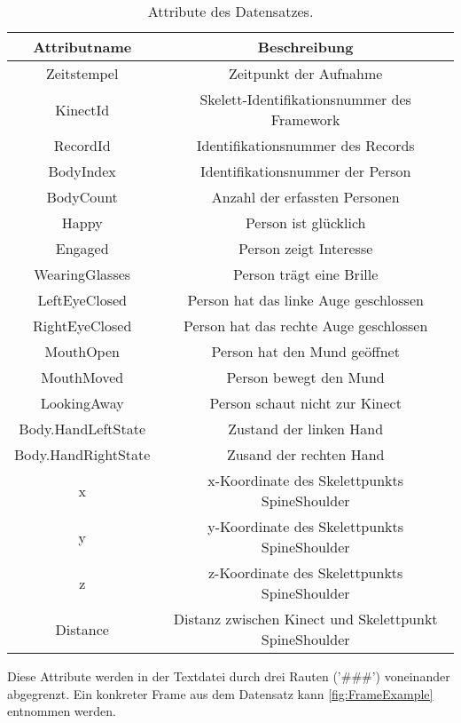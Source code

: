 \begin{table}[ht]
  \begin{center}
    \begin{tabular}{ |c|c| } 
      \hline
      Attributname & Beschreibung \\
      \hline \hline
      Zeitstempel & Zeitpunkt der Aufnahme \\
      \hline
      KinectId & Skelett-Identifikationsnummer des Framework  \\
      \hline
      RecordId & Identifikationsnummer des Records \\
      \hline
      BodyIndex & Identifikationsnummer der Person \\
      \hline
      BodyCount & Anzahl der erfassten Personen \\
      \hline
      Happy & Person ist glücklich \\
      \hline
      Engaged & Person zeigt Interesse \\
      \hline
      WearingGlasses & Person trägt eine Brille \\
      \hline
      LeftEyeClosed & Person hat das linke Auge geschlossen \\
      \hline
      RightEyeClosed & Person hat das rechte Auge geschlossen \\
      \hline
      MouthOpen & Person hat den Mund geöffnet \\
      \hline
      MouthMoved & Person bewegt den Mund\\
      \hline
      LookingAway & Person schaut nicht zur Kinect \\
      \hline
      Body.HandLeftState & Zustand der linken Hand \\
      \hline
      Body.HandRightState & Zusand der rechten Hand \\
      \hline
      x & x-Koordinate des Skelettpunkts SpineShoulder \\
      \hline
      y & y-Koordinate des Skelettpunkts SpineShoulder \\
      \hline
      z & z-Koordinate des Skelettpunkts SpineShoulder \\
      \hline
      Distance & Distanz zwischen Kinect und Skelettpunkt SpineShoulder \\
      \hline
    \end{tabular}
    \caption{Attribute des Datensatzes.}
    \label{tbl:AttributesDataset}
  \end{center}
\end{table}
Diese Attribute werden in der Textdatei durch drei Rauten ('\#\#\#') voneinander abgegrenzt.
Ein konkreter Frame aus dem Datensatz kann \autoref{fig:FrameExample} entnommen werden.


